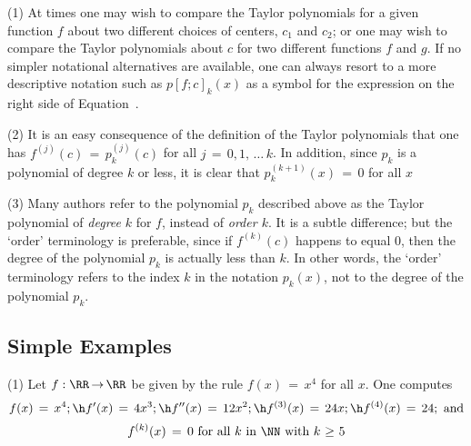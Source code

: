 {\V


\hspace*{\parindent}(1) At times one may wish to compare the Taylor polynomials for a given function $f$ about two different choices of centers, $c_{1}$ and $c_{2}$;
    or one may wish to compare the Taylor polynomials about $c$ for two different functions $f$ and $g$.
    If no simpler notational alternatives are available, one can always resort to a more descriptive notation such as
    $p[f;c]_{k}(x)$ as a symbol for the expression on the right side of Equation~.

\V

        (2) It is an easy consequence of the definition of the Taylor polynomials that one has $f^{(j)}(c) \,=\, p_{k}^{(j)}(c)$ for all $j \,=\, 0,1,\,{\ldots}\,k$.
    In addition, since $p_{k}$ is a polynomial of degree $k$ or less, it is clear that $p_{k}^{(k+1)}(x) \,=\, 0$ for all $x$

\V

        (3) Many authors refer to the polynomial $p_{k}$ described above as the Taylor polynomial of {\em degree} $k$ for $f$, instead of {\em order $k$}.
    It is a subtle difference; but the `order' terminology is preferable, since if $f^{(k)}(c)$ happens to equal $0$, then the degree of the polynomial $p_{k}$ is actually less than $k$.
    In other words, the `order' terminology refers to the index $k$ in the notation $p_{k}(x)$, not to the degree of the polynomial $p_{k}$.

\VV

            \subsection{\small{\bf Simple Examples}}
            \label{ExampE60.30}

\V

\hspace*{\parindent}(1) Let $f:{\RR} \,{\rightarrow}\, {\RR}$ be given by the rule $f(x) \,=\, x^{4}$ for all $x$.
    One computes
        \begin{displaymath}
        f(x) \,=\, x^{4}; \h f'(x) \,=\, 4x^{3}; \h f''(x) \,=\, 12x^{2}; \h f^{(3)}(x) \,=\, 24x; \h f^{(4)}(x) \,=\, 24; \mbox{ and}
        \end{displaymath}
        \begin{displaymath}
         f^{(k)}(x) \,=\, 0
\mbox{ for all $k$ in ${\NN}$ with $k\,\,{\geq}\,\,5$}
        \end{displaymath}

}

